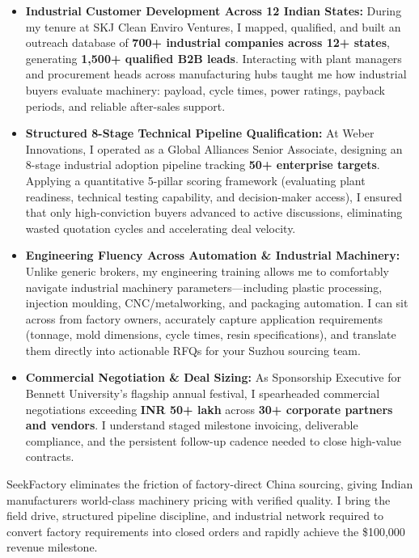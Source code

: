 \documentclass[letterpaper,10pt]{article}
\begin{document}
\begin{itemize}[leftmargin=0.18in, itemsep=2.5pt, topsep=2.5pt]
  \item \textbf{Industrial Customer Development Across 12 Indian States:} During my tenure at SKJ Clean Enviro Ventures, I mapped, qualified, and built an outreach database of \textbf{700+ industrial companies across 12+ states}, generating \textbf{1,500+ qualified B2B leads}. Interacting with plant managers and procurement heads across manufacturing hubs taught me how industrial buyers evaluate machinery: payload, cycle times, power ratings, payback periods, and reliable after-sales support.

  \item \textbf{Structured 8-Stage Technical Pipeline Qualification:} At Weber Innovations, I operated as a Global Alliances Senior Associate, designing an 8-stage industrial adoption pipeline tracking \textbf{50+ enterprise targets}. Applying a quantitative 5-pillar scoring framework (evaluating plant readiness, technical testing capability, and decision-maker access), I ensured that only high-conviction buyers advanced to active discussions, eliminating wasted quotation cycles and accelerating deal velocity.

  \item \textbf{Engineering Fluency Across Automation \& Industrial Machinery:} Unlike generic brokers, my engineering training allows me to comfortably navigate industrial machinery parameters—including plastic processing, injection moulding, CNC/metalworking, and packaging automation. I can sit across from factory owners, accurately capture application requirements (tonnage, mold dimensions, cycle times, resin specifications), and translate them directly into actionable RFQs for your Suzhou sourcing team.

  \item \textbf{Commercial Negotiation \& Deal Sizing:} As Sponsorship Executive for Bennett University's flagship annual festival, I spearheaded commercial negotiations exceeding \textbf{INR 50+ lakh} across \textbf{30+ corporate partners and vendors}. I understand staged milestone invoicing, deliverable compliance, and the persistent follow-up cadence needed to close high-value contracts.
\end{itemize}

\vspace{3pt}
SeekFactory eliminates the friction of factory-direct China sourcing, giving Indian manufacturers world-class machinery pricing with verified quality. I bring the field drive, structured pipeline discipline, and industrial network required to convert factory requirements into closed orders and rapidly achieve the \$100,000 revenue milestone.
\end{document}
